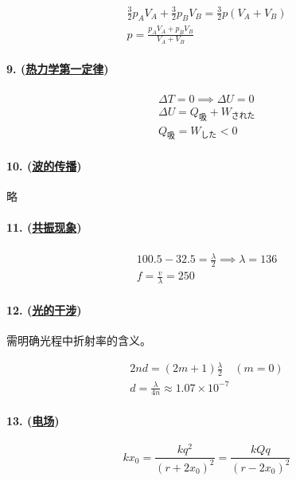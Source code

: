 \begin{gather*}
    \frac32p_AV_A+\frac32p_BV_B=\frac32p(V_A+V_B)\\
    p=\frac{p_AV_A+p_BV_B}{V_A+V_B}
\end{gather*}

\paragraph{9. (\hyperref[subsec:热力学第一定律]{热力学第一定律})}

\begin{gather*}
    \Delta T=0\implies\Delta U=0\\
    \Delta U=Q_\textrm{吸}+W_\textrm{された}\\
    Q_\textrm{吸}=W_\textrm{した}<0
\end{gather*}

\paragraph{10. (\hyperref[subsec:波的传播]{波的传播})} 略
\paragraph{11. (\hyperref[subsec:共振现象]{共振现象})}

\begin{gather*}
    100.5-32.5=\frac{\lambda}{2}\implies\lambda=136\\
    f=\frac{v}{\lambda}=250
\end{gather*}

\paragraph{12. (\hyperref[subsec:光的干涉]{光的干涉})} 需明确光程中折射率的含义。

\begin{gather*}
    2nd=(2m+1)\frac{\lambda}{2}\quad(m=0)\\
    d=\frac{\lambda}{4n}\approx1.07\times10^{-7}
\end{gather*}

\paragraph{13. (\hyperref[subsec:电场]{电场})}

\begin{equation*}
    kx_0=\frac{kq^2}{(r+2x_0)^2}=\frac{kQq}{(r-2x_0)^2}
\end{equation*}

